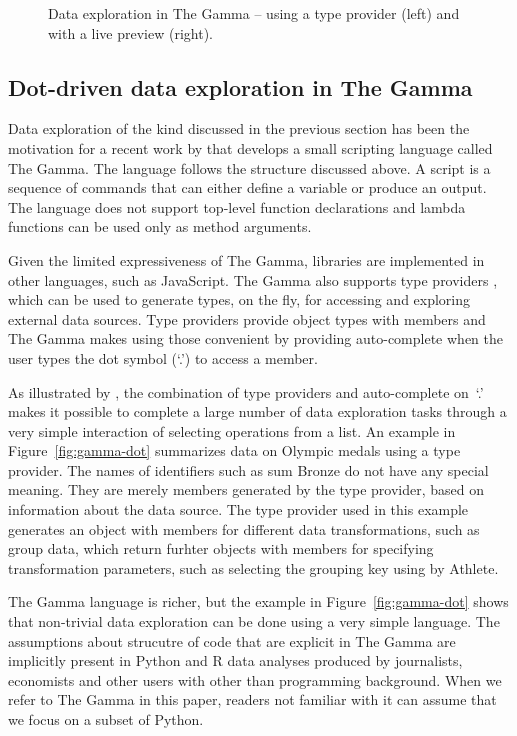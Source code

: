 \documentclass[acmsmall,anonymous,fleqn]{acmart}\settopmatter{printfolios=false,printccs=false,printacmref=false}
\theoremstyle{plain}
\theoremstyle{definition}
\newcommand{\qident}[1]{\textnormal{\sffamily \textquotesingle #1\textquotesingle}}
\begin{document}
\begin{figure}[b]
  \caption{\small Data exploration in The Gamma -- using a type provider (left) and with a live
    preview (right).}
  \label{fig:gamma-intro}
\end{figure}

\subsection{Dot-driven data exploration in The Gamma}
\label{sec:background-gamma}

Data exploration of the kind discussed in the previous section has been the motivation for a
recent work by \citet{gamma} that develops a small scripting language called The Gamma. The language
follows the structure discussed above. A script is a sequence of commands that can either define a
variable or produce an output. The language does not support top-level function declarations
and lambda functions can be used only as method arguments.

Given the limited expressiveness of The Gamma, libraries are implemented in other languages,
such as JavaScript. The Gamma also supports type providers \cite{providers-fsharp},
which can be used to generate types, on the fly, for accessing and exploring external data sources.
Type providers provide object types with members and The Gamma makes using those convenient by
providing auto-complete when the user types the dot symbol (`.') to access a member.

As illustrated by \citet{gamma}, the combination of type providers and auto-complete on~`.' makes it
possible to complete a large number of data exploration tasks through a very simple interaction of
selecting operations from a list. An example in Figure~\ref{fig:gamma-dot} summarizes data on
Olympic medals using a type provider. The names of identifiers such as \qident{sum Bronze} do not have
any special meaning. They are merely members generated by the type provider, based on information
about the data source. The type provider used in this example generates an object with members for
different data transformations, such as \qident{group data}, which return furhter objects with
members for specifying transformation parameters, such as selecting the grouping key using
\qident{by Athlete}.

The Gamma language is richer, but the example in Figure~\ref{fig:gamma-dot} shows that non-trivial
data exploration can be done using a very simple language. The assumptions about strucutre of
code that are explicit in The Gamma are implicitly present in Python and R data analyses
produced by journalists, economists and other users with other than programming background.
When we refer to The Gamma in this paper, readers not familiar with it can assume that we focus
on a subset of Python.
\end{document}
